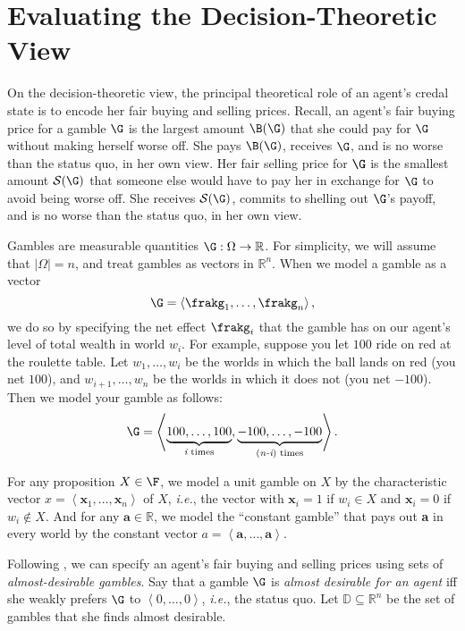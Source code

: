 \section{Evaluating the Decision-Theoretic View}\label{konek-sec-6}

On the decision-theoretic view, the principal theoretical role of an agent's credal state is to encode her fair buying and selling prices. Recall, an agent's fair buying price for a gamble $\G$ is the largest amount $\B(\G)$ that she could pay for $\G$ without making herself worse off. She pays $\B(\G)$, receives $\G$, and is no worse than the status quo, in her own view. Her fair selling price for $\G$ is the smallest amount $\mathcal{S}(\G)$ that someone else would have to pay her in exchange for $\G$ to avoid being worse off. She receives $\mathcal{S}(\G)$, commits to shelling out $\G$'s payoff, and is no worse than the status quo, in her own view.

Gambles are measurable quantities $\G:\Omega\rightarrow\mathbb{R}$. For simplicity, we will assume that $|\Omega|=n$, and treat gambles as vectors in $\mathbb{R}^n$. When we model a gamble as a vector
$$ \G=\left<\frakg_1,\hdots,\frakg_n\right>, $$
we do so by specifying the net effect $\frakg_i$ that the gamble has on our agent's level of total wealth in world $w_i$. For example, suppose you let \textsterling$100$ ride on red at the roulette table. Let $w_1,\hdots,w_i$ be the worlds in which the ball lands on red (you net \textsterling$100$), and $w_{i+1},\hdots,w_n$ be the worlds in which it does not (you net $-$\textsterling$100$). Then we model your gamble as follows:
$$
\G=\left<\underbrace{100,\hdots,100}_{\textit{i} \text{ times}}, \underbrace{-100,\hdots,-100}_{(\textit{n-i}) \text{ times}}\right>.
$$

For any proposition $X\in\F$, we model a unit gamble on $X$ by the characteristic vector $x=\left<\textbf{x}_1,\hdots,\textbf{x}_n\right>$ of $X$, \textit{i.e.}, the vector with $\textbf{x}_i=1$ if $w_i\in X$ and $\textbf{x}_i=0$ if $w_i\not\in X$. And for any $\textbf{a}\in\mathbb{R}$, we model the ``constant gamble'' that pays out \textsterling\textbf{a} in every world by the constant vector $a=\left<\textbf{a},\hdots,\textbf{a}\right>$.

Following \citet{Walley1991}, we can specify an agent's fair buying and selling prices using sets of \textit{almost-desirable gambles}. Say that a gamble $\G$ is \textit{almost desirable for an agent} iff she weakly prefers $\G$ to $\left<0,\hdots,0\right>$, \textit{i.e.}, the status quo. Let $\mathbb{D}\subseteq\mathbb{R}^n$ be the set of gambles that she finds almost desirable.

